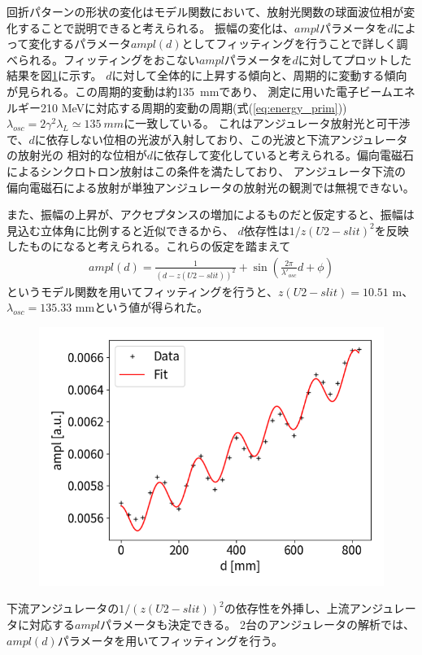 \documentclass[a4paper,11pt,uplatex]{jsbook}
\begin{document}
回折パターンの形状の変化はモデル関数において、放射光関数の球面波位相が変化することで説明できると考えられる。
振幅の変化は、$ampl$パラメータを$d$によって変化するパラメータ$ampl(d)$としてフィッティングを行うことで詳しく調べられる。フィッティングをおこない$ampl$パラメータを$d$に対してプロットした結果を図\ref{DCampl}に示す。
$d$に対して全体的に上昇する傾向と、周期的に変動する傾向が見られる。この周期的変動は約135~mmであり、
測定に用いた電子ビームエネルギー210 MeVに対応する周期的変動の周期(式(\ref{eq:energy_prim}))$\lambda_{osc} = 2\gamma^2\lambda_L \simeq 135~mm$に一致している。
これはアンジュレータ放射光と可干渉で、$d$に依存しない位相の光波が入射しており、この光波と下流アンジュレータの放射光の
相対的な位相が$d$に依存して変化していると考えられる。偏向電磁石によるシンクロトロン放射はこの条件を満たしており、
アンジュレータ下流の偏向電磁石による放射が単独アンジュレータの放射光の観測では無視できない。

また、振幅の上昇が、アクセプタンスの増加によるものだと仮定すると、振幅は見込む立体角に比例すると近似できるから、
$d$依存性は$1/z(U2-slit)^2$を反映したものになると考えられる。これらの仮定を踏まえて
\begin{eqnarray}
  ampl(d) = \frac{1}{(d - z(U2-slit))^2} + \sin\left( \frac{2\pi}{\lambda'_{osc}}d + \phi \right)\label{eq:ampl}
\end{eqnarray}
というモデル関数を用いてフィッティングを行うと、$z(U2-slit) = 10.51$ m、$\lambda_{osc}= 135.33$ mmという値が得られた。

\begin{figure}[h]
  \centering
  \includegraphics[width=0.8\linewidth]{image/4-DCampl.png}
  \caption[アンジュレータ位置依存性]{}\label{DCampl}
\end{figure}

下流アンジュレータの$1/(z(U2-slit))^2$の依存性を外挿し、上流アンジュレータに対応する$ampl$パラメータも決定できる。
2台のアンジュレータの解析では、$ampl(d)$パラメータを用いてフィッティングを行う。
\end{document}
